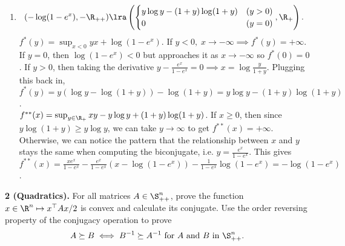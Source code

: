 \documentclass[../borwein-lewis_notes.tex]{subfiles}
\begin{document}
{\begin{enumerate}
 For $y>1$, taking the derivative, $y - \frac{e^x}{1+e^x} = 0
\implies x=\log\frac{y}{1-y}$. Thus, $f^*(y) = y(\log y-\log(1-y))
+\log(1-y) = y\log y + (1-y)\log(1-y)$. \\
$f^{**}(x) = \sup_{y\in[0,1]}xy - y\log y - (1-y)\log(1-y)$. 
Taking the derivative, $x-\log y - 1 +\log(1-y) + 1 = x -\log\frac{y}{1-y}
= 0\implies y = \frac{e^x}{1+e^x}$. This gives $f^{**}(x) 
= \frac{xe^x}{1+e^x} + \frac{e^x}{1+e^x}(\log(1+e^{x})-x) + 
\frac{1}{1+e^x}\log(1+e^x)=\log(1+e^x)$.
\item \text{}\vspace{-0.2in}
\begin{equation*}
(-\log(1-e^x),-\R_{++})\lra \left(\begin{cases} y\log y - (1+y)\log(1+y) 
&(y>0) \\ 0 & (y=0)\end{cases}, \R_+\right).
\end{equation*}
$f^*(y) = \sup_{x<0} yx +\log(1-e^x)$. If $y<0,\;x\to-\infty\implies 
f^*(y) = +\infty$. If $y=0$, then $\log(1-e^x)<0$ but approaches it 
as $x\to-\infty$ so $f^*(0)=0$. If $y>0$, then taking the derivative 
$y - \frac{e^x}{1-e^x} = 0 \implies x = \log\frac{y}{1+y}$. Plugging 
this back in, $f^*(y) = y(\log y - \log(1+y)) -\log(1+y) 
= y\log y - (1+y)\log(1+y)$. \\
$f^{**}(x) = \sup_{y\in\R_+} xy -y\log y + (1+y)\log(1+y)$. If 
$x\geq 0$, then since $y\log(1+y) \geq y\log y$, we can take $y\to\infty$
to get $f^{**}(x)=+\infty$. Otherwise, we can notice the pattern that 
the relationship between $x$ and $y$ stays the same when computing the 
biconjugate, i.e. $y = \frac{e^x}{1-e^x}$. This gives 
$f^{**}(x) = \frac{xe^x}{1-e^x} -\frac{e^x}{1-e^x}(x-\log(1-e^x))
- \frac{1}{1-e^x}\log(1-e^x) = -\log(1-e^x)$.
\end{enumerate}
}\noindent
\textbf{2 (Quadratics).} For all matrices $A\in\S_{++}^n$, prove the 
function $x\in\R^n\mapsto x^\top Ax/2$ is convex and calculate its 
conjugate. Use the order reversing property of the conjugacy operation
to prove 
\begin{equation*}
A\succeq B\iff B^{-1}\succeq A^{-1} \text{ for }A\text{ and }
B\text{ in }\S_{++}^n.
\end{equation*}
\end{document}
